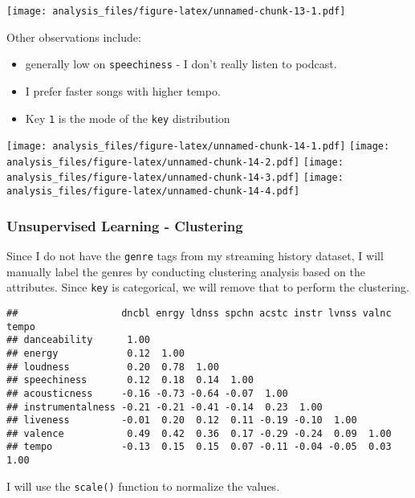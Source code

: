 \documentclass[
]{article}
\begin{document}
\texttt{[image: analysis\_files/figure-latex/unnamed-chunk-13-1.pdf]}

Other observations include:

\begin{itemize}
\item
  generally low on \texttt{speechiness} - I don't really listen to
  podcast.
\item
  I prefer faster songs with higher tempo.
\item
  Key \texttt{1} is the mode of the \texttt{key} distribution
\end{itemize}

\texttt{[image: analysis\_files/figure-latex/unnamed-chunk-14-1.pdf]}
\texttt{[image: analysis\_files/figure-latex/unnamed-chunk-14-2.pdf]}
\texttt{[image: analysis\_files/figure-latex/unnamed-chunk-14-3.pdf]}
\texttt{[image: analysis\_files/figure-latex/unnamed-chunk-14-4.pdf]}

\hypertarget{unsupervised-learning---clustering}{%
\subsubsection{Unsupervised Learning -
Clustering}\label{unsupervised-learning---clustering}}

Since I do not have the \texttt{genre} tags from my streaming history
dataset, I will manually label the genres by conducting clustering
analysis based on the attributes. Since \texttt{key} is categorical, we
will remove that to perform the clustering.

\begin{verbatim}
##                  dncbl enrgy ldnss spchn acstc instr lvnss valnc tempo
## danceability      1.00                                                
## energy            0.12  1.00                                          
## loudness          0.20  0.78  1.00                                    
## speechiness       0.12  0.18  0.14  1.00                              
## acousticness     -0.16 -0.73 -0.64 -0.07  1.00                        
## instrumentalness -0.21 -0.21 -0.41 -0.14  0.23  1.00                  
## liveness         -0.01  0.20  0.12  0.11 -0.19 -0.10  1.00            
## valence           0.49  0.42  0.36  0.17 -0.29 -0.24  0.09  1.00      
## tempo            -0.13  0.15  0.15  0.07 -0.11 -0.04 -0.05  0.03  1.00
\end{verbatim}

I will use the \texttt{scale()} function to normalize the values.
\end{document}
